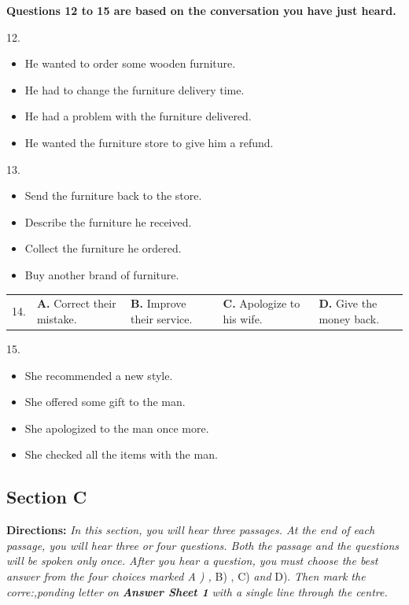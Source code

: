 \documentclass[UTF8,11pt]{ctexart}
\begin{document}
\textbf{Questions 12 to 15 are based on the conversation you have just heard.}


12.


\begin{itemize}[leftmargin=2em,itemsep=.2em,topsep=.4em]\item[A.] He wanted to order some wooden furniture.
\item[B.] He had to change the furniture delivery time.
\item[C.] He had a problem with the furniture delivered.
\item[D.] He wanted the furniture store to give him a refund.
\end{itemize}

13.


\begin{itemize}[leftmargin=2em,itemsep=.2em,topsep=.4em]\item[A.] Send the furniture back to the store.
\item[B.] Describe the furniture he received.
\item[C.] Collect the furniture he ordered.
\item[D.] Buy another brand of furniture.
\end{itemize}

\noindent\begin{tabularx}{\linewidth}{@{}lXXXX@{}}14. & \textbf{A.} Correct their mistake. & \textbf{B.} Improve their service. & \textbf{C.} Apologize to his wife. & \textbf{D.} Give the money back.\\\end{tabularx}\par

15.


\begin{itemize}[leftmargin=2em,itemsep=.2em,topsep=.4em]\item[A.] She recommended a new style.
\item[B.] She offered some gift to the man.
\item[C.] She apologized to the man once more.
\item[D.] She checked all the items with the man.
\end{itemize}

\subsection*{\textbf{Section C}}


\textbf{Directions: }\textit{In this section, you will hear three passages. At the end of each passage, you will hear three or} \textit{four questions. Both the passage and the questions will be spoken only once. After you hear a question, you} \textit{must choose the best answer from the four choices marked A ) , }B) , C) \textit{and }D). \textit{Then mark the} \textit{corre:,ponding letter on }\textbf{\textit{Answer Sheet 1 }}\textit{with a single line through the centre.}
\end{document}
